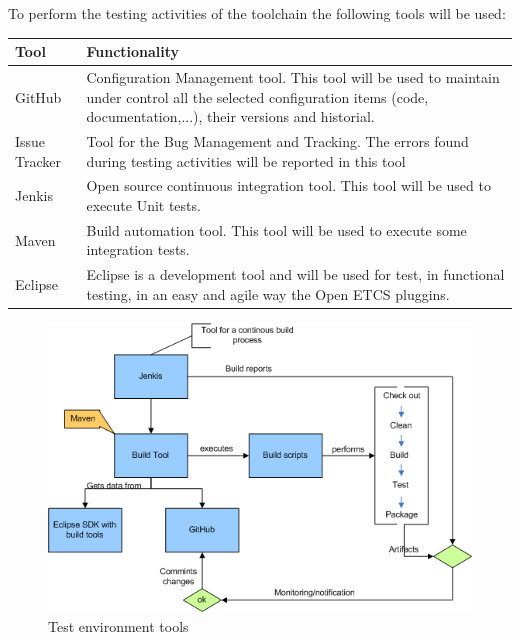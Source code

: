 To perform the testing activities of the toolchain the following tools will be used:

\begin{center}
\begin{longtable}{|p{2cm}|p{8cm}|}\hline
\textbf{Tool} & \textbf{Functionality}\\\hline
GitHub & Configuration Management tool. This tool will be used to maintain under control all the selected configuration items (code, documentation,...), their versions and historial.\\\hline
Issue Tracker & Tool for the Bug Management and Tracking. The errors found during testing activities will be reported in this tool\\\hline
Jenkis & Open source continuous integration tool. This tool will be used to execute Unit tests.\\\hline
Maven &  Build automation tool. This tool will be used to execute some integration tests.\\\hline
Eclipse & Eclipse is a development tool and will be used for test, in functional testing, in an easy and agile way the Open ETCS pluggins.\\\hline
\end{longtable}
\end{center}

\begin{figure}[htbp]
\includegraphics[width=\textwidth]{tools}
\caption{\label{fig:tools} Test environment tools} 
\end{figure}

